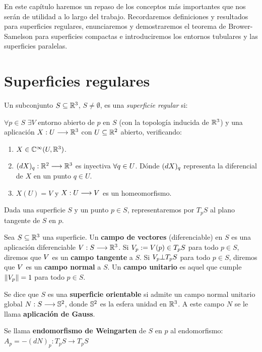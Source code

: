 En este capítulo haremos un repaso de los conceptos más importantes que nos serán de utilidad a lo largo del trabajo. Recordaremos definiciones y resultados para superficies regulares, enunciaremos y demostraremos el teorema de Brower-Samelson para superficies compactas e introduciremos los entornos tubulares y las superficies paralelas.

\section{Superficies regulares}

\begin{definition}
Un subconjunto $S \subseteq \mathbb{R}^3$, $S \neq \emptyset$, es una \textit{superficie regular} si:

$\forall p \in S$ $\exists V$ entorno abierto de $p$ en $S$ (con la topología inducida de $\mathbb{R}^3$) y una aplicación $X: U \longrightarrow \mathbb{R}^3$ con $U \subseteq \mathbb{R}^2$ abierto, verificando:

\begin{enumerate}
    \item $X \in \mathbb{C}^\infty(U, \mathbb{R}^3)$.
    \item $(dX)_{q}: \mathbb{R}^2 \longrightarrow \mathbb{R}^3$ es inyectiva $\forall q \in U$. Dónde $(dX)_{q}$ representa la diferencial de $X$ en un punto $q \in U$.
    \item $X(U) = V$ y $X:U \longrightarrow V$ es un homeomorfismo.
\end{enumerate}
\end{definition}

Dada una superficie $S$ y un punto $p \in S$, representaremos por $T_pS$ al plano tangente de $S$ en $p$.

Sea $S \subseteq \mathbb{R}^3$ una superficie. Un \textbf{campo de vectores} (diferenciable) en $S$ es una aplicación diferenciable $V: S \longrightarrow \mathbb{R}^3$. Si $V_p := V(p) \in T_p S$ para todo $p \in S$, diremos que $V$ es un \textbf{campo tangente} a $S$. Si $V_p \bot T_p S$ para todo $p \in S$, diremos que $V$ es un \textbf{campo normal} a $S$. Un \textbf{campo unitario} es aquel que cumple $\lVert V_p \rVert = 1$ para todo $p \in S$.

Se dice que $S$ es una \textbf{superficie orientable} si admite un campo normal unitario global $N: S \longrightarrow \mathbb{S}^2$, donde $\mathbb{S}^2$ es la esfera unidad en $\mathbb{R}^3$. A este campo $N$ se le llama \textbf{aplicación de Gauss}.

Se llama \textbf{endomorfismo de Weingarten} de $S$ en $p$ al endomorfismo: $A_p = -(dN)_p: T_pS \longrightarrow T_pS$

